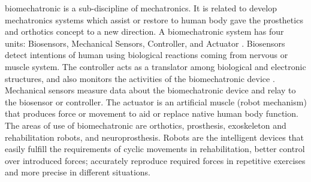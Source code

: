 \documentclass{article}
\begin{document}
biomechatronic is a sub-discipline of mechatronics. It is related to develop 
mechatronics systems which assist or restore to human body gave the 
prosthetics and orthotics concept to a new direction. A biomechatronic 
system has four units: Biosensors, Mechanical Sensors, Controller, and 
Actuator . Biosensors detect intentions of human using biological reactions 
coming from nervous or muscle system. The controller acts as a translator 
among biological and electronic structures, and also monitors the activities 
of the biomechatronic device .
Mechanical sensors measure data about the biomechatronic device and 
relay to the biosensor or controller. The actuator is an artificial muscle 
(robot mechanism) that produces force or movement to aid or replace 
native human body function. The areas of use of biomechatronic are 
orthotics, prosthesis, exoskeleton and rehabilitation robots, and 
neuroprosthesis. Robots are the intelligent devices that easily fulfill the 
requirements of cyclic movements in rehabilitation, better control over 
introduced forces; accurately reproduce required forces in repetitive 
exercises and more precise in different situations.
\end{document}
